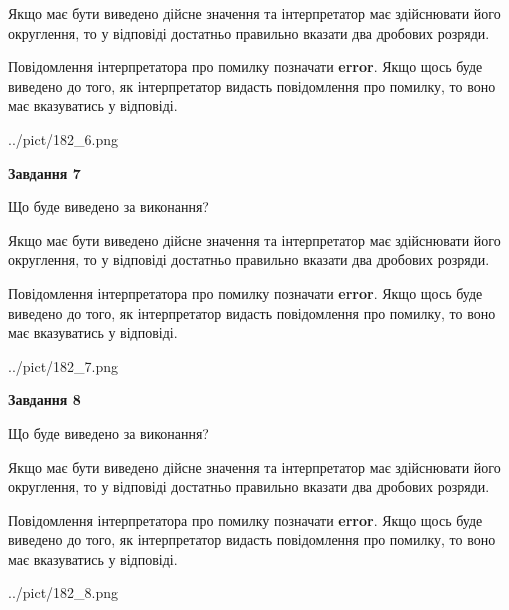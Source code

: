 \documentclass[12pt, ukrainian]{article}
\begin{document}
{\begin {Large}
Якщо має бути виведено дійсне значення та інтерпретатор має здійснювати його округлення, 
то у відповіді достатньо правильно вказати два дробових розряди.

Повідомлення інтерпретатора про помилку позначати \textbf{error}.
Якщо щось буде виведено до того, як інтерпретатор видасть повідомлення про помилку, 
то воно має вказуватись у відповіді. \par

\begin{center}
	{../pict/182_6.png}
\end{center}
\newpage

{\begin {center}\textbf{Завдання 7}\end {center}}\par
Що буде виведено за виконання? \par

Якщо має бути виведено дійсне значення та інтерпретатор має здійснювати його округлення, 
то у відповіді достатньо правильно вказати два дробових розряди.

Повідомлення інтерпретатора про помилку позначати \textbf{error}.
Якщо щось буде виведено до того, як інтерпретатор видасть повідомлення про помилку, 
то воно має вказуватись у відповіді. \par

\begin{center}
	{../pict/182_7.png}
\end{center}
\newpage

{\begin {center}\textbf{Завдання 8}\end {center}}\par
Що буде виведено за виконання? \par

Якщо має бути виведено дійсне значення та інтерпретатор має здійснювати його округлення, 
то у відповіді достатньо правильно вказати два дробових розряди.

Повідомлення інтерпретатора про помилку позначати \textbf{error}.
Якщо щось буде виведено до того, як інтерпретатор видасть повідомлення про помилку, 
то воно має вказуватись у відповіді. \par

\begin{center}
	{../pict/182_8.png}
\end{center}
\newpage


\end{Large}}
\end{document}
